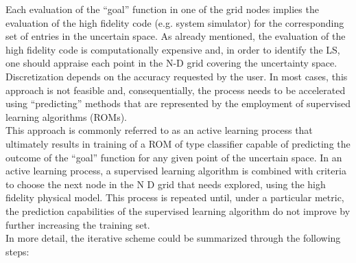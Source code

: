 Each evaluation of the ``goal'' function in one of the grid nodes implies 
the evaluation of the high fidelity code (e.g. system simulator) for the 
corresponding set of entries in the uncertain space. As already 
mentioned, the evaluation of the high fidelity code is computationally 
expensive and, in order to identify the LS, one should appraise 
each point in the N-D grid covering the uncertainty space. 
Discretization depends on the accuracy requested by the user. In 
most cases, this approach is not feasible and, consequentially, the 
process needs to be accelerated using ``predicting'' methods that are 
represented by the employment of supervised learning algorithms 
(ROMs).
\\This approach is commonly referred to as an active learning process 
that ultimately results in training of a ROM of type classifier capable of 
predicting the outcome of the ``goal'' function for any given point of 
the uncertain space.
In an active learning process, a supervised learning algorithm is 
combined with criteria to choose the next node in the N D grid that 
needs explored, using the high fidelity physical model. This process is 
repeated until, under a particular metric, the prediction capabilities of 
the supervised learning algorithm do not improve by further increasing 
the training set.
\\In more detail, the iterative scheme could be summarized through the following steps:
